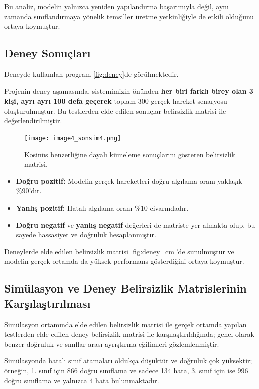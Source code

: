 Bu analiz, modelin yalnızca yeniden yapılandırma başarımıyla değil, aynı zamanda sınıflandırmaya yönelik temsiller üretme yetkinliğiyle de etkili olduğunu ortaya koymuştur.




\subsection{Deney Sonuçları}

Deneyde kullanılan program \ref{fig:deney}de görülmektedir.


Projenin deney aşamasında, sistemimizin önünden \textbf{her biri farklı birey olan 3 kişi, ayrı ayrı 100 defa geçerek} toplam 300 gerçek hareket senaryosu oluşturulmuştur. Bu testlerden elde edilen sonuçlar belirsizlik matrisi ile değerlendirilmiştir.

\begin{figure}[H]
    \centering
    \texttt{[image: image4\_sonsim4.png]}
    \caption{Kosinüs benzerliğine dayalı kümeleme sonuçlarını gösteren belirsizlik matrisi.}
    \label{fig:sonsim4}
\end{figure}

\begin{itemize}
    \item \textbf{Doğru pozitif:} Modelin gerçek hareketleri doğru algılama oranı yaklaşık \%90'dır.
    \item \textbf{Yanlış pozitif:} Hatalı algılama oranı \%10 civarındadır.
    \item \textbf{Doğru negatif} ve \textbf{yanlış negatif} değerleri de matriste yer almakta olup, bu sayede hassasiyet ve doğruluk hesaplanmıştır.
\end{itemize}

Deneylerde elde edilen belirsizlik matrisi \ref{fig:deney_cm}’de sunulmuştur ve modelin gerçek ortamda da yüksek performans gösterdiğini ortaya koymuştur.


\subsection{Simülasyon ve Deney Belirsizlik Matrislerinin Karşılaştırılması}

Simülasyon ortamında elde edilen belirsizlik matrisi ile gerçek ortamda yapılan testlerden elde edilen deney belirsizlik matrisi ile karşılaştırıldığında; genel olarak benzer doğruluk ve sınıflar arası ayrıştırma eğilimleri gözlemlenmiştir.


Simülasyonda hatalı sınıf atamaları oldukça düşüktür ve doğruluk çok yüksektir; örneğin, 1. sınıf için 866 doğru sınıflama ve sadece 134 hata, 3. sınıf için ise 996 doğru sınıflama ve yalnızca 4 hata bulunmaktadır.


